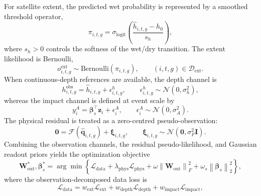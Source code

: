 \documentclass[pdflatex,sn-mathphys-ay]{sn-jnl}
\theoremstyle{thmstyleone}
\begin{document}
For satellite extent, the predicted wet probability is represented by a
smoothed threshold operator,
\begin{equation}
  \pi_{i,t,g}
  =
  \sigma_{\mathrm{logit}}
  \left(
    \frac{\hat{h}_{i,t,g}-h_0}{s_h}
  \right),
  \label{eq:wet_probability}
\end{equation}
where $s_h>0$ controls the softness of the wet/dry transition.  The
extent likelihood is Bernoulli,
\begin{equation}
  o^{\mathrm{ext}}_{i,t,g}
  \sim
  \mathrm{Bernoulli}(\pi_{i,t,g}),
  \qquad
  (i,t,g)\in\mathcal{D}_{\mathrm{ext}}.
  \label{eq:extent_likelihood}
\end{equation}
When continuous-depth references are available, the depth channel is
\begin{equation}
  h^{\mathrm{obs}}_{i,t,g}
  =
  \hat{h}_{i,t,g}
  +
  \epsilon^{h}_{i,t,g},
  \qquad
  \epsilon^{h}_{i,t,g}
  \sim
  \mathcal{N}(0,\sigma_h^2),
  \label{eq:depth_likelihood}
\end{equation}
whereas the impact channel is defined at event scale by
\begin{equation}
  y^{A}_{i}
  =
  \boldsymbol{\beta}_{s}^{\top}
  \mathbf{z}_{i}
  +
  \epsilon^{A}_{i},
  \qquad
  \epsilon^{A}_{i}
  \sim
  \mathcal{N}(0,\sigma_A^2).
  \label{eq:impact_likelihood}
\end{equation}
The physical residual is treated as a zero-centred pseudo-observation:
\begin{equation}
  \mathbf{0}
  =
  \mathcal{F}
  \left(
    \hat{\mathbf{q}}_{i,t,g}
  \right)
  +
  \boldsymbol{\xi}_{i,t,g},
  \qquad
  \boldsymbol{\xi}_{i,t,g}
  \sim
  \mathcal{N}
  \left(
    \mathbf{0},
    \sigma^{2}_{F}\mathbf{I}
  \right).
  \label{eq:padr_physics_model}
\end{equation}
Combining the observation channels, the residual pseudo-likelihood, and
Gaussian readout priors yields the optimization objective
\begin{equation}
  \mathbf{W}^{*}_{\mathrm{out}},
  \boldsymbol{\beta}^{*}_{s}
  =
  \arg\min
  \left\{
    \mathcal{L}_{\mathrm{data}}
    +
    \lambda_{\mathrm{phys}}
    \mathcal{L}_{\mathrm{phys}}
    +
    \omega
    \left\|
      \mathbf{W}_{\mathrm{out}}
    \right\|_{F}^{2}
    +
    \omega_s
    \left\|
      \boldsymbol{\beta}_{s}
    \right\|_2^2
  \right\},
  \label{eq:padr_map_objective}
\end{equation}
where the observation-decomposed data loss is
\begin{equation}
  \mathcal{L}_{\mathrm{data}}
  =
  w_{\mathrm{ext}}\mathcal{L}_{\mathrm{ext}}
  +
  w_{\mathrm{depth}}\mathcal{L}_{\mathrm{depth}}
  +
  w_{\mathrm{impact}}\mathcal{L}_{\mathrm{impact}},
  \label{eq:weak_data_loss}
\end{equation}
\end{document}
